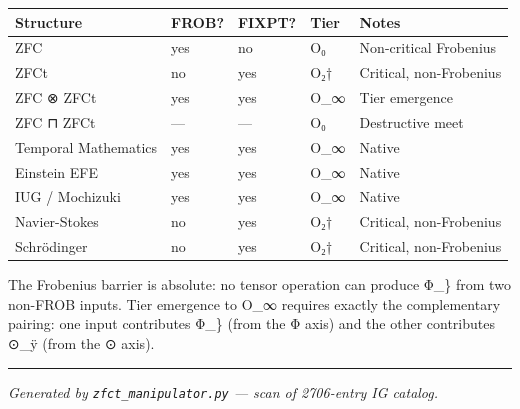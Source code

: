 {\def\LTcaptype{none} %
\begin{longtable}[]{@{}lllll@{}}
\toprule\noalign{}
Structure & FROB? & FIXPT? & Tier & Notes \\
\midrule\noalign{}
\endhead
\bottomrule\noalign{}
\endlastfoot
ZFC & yes & no & O₀ & Non-critical Frobenius \\
ZFCt & no & yes & O₂† & Critical, non-Frobenius \\
ZFC {\igprimfont\upshape ⊗} ZFCt & yes & yes & O\_∞ & Tier emergence \\
ZFC ⊓ ZFCt & --- & --- & O₀ & Destructive meet \\
Temporal Mathematics & yes & yes & O\_∞ & Native \\
Einstein EFE & yes & yes & O\_∞ & Native \\
IUG / Mochizuki & yes & yes & O\_∞ & Native \\
Navier-Stokes & no & yes & O₂† & Critical, non-Frobenius \\
Schrödinger & no & yes & O₂† & Critical, non-Frobenius \\
\end{longtable}
}

The Frobenius barrier is absolute: no tensor operation can produce Φ\_\}
from two non-FROB inputs. Tier emergence to O\_∞ requires exactly the
complementary pairing: one input contributes Φ\_\} (from the Φ axis) and
the other contributes ⊙\_ÿ (from the ⊙ axis).

\begin{center}\rule{0.5\linewidth}{0.5pt}\end{center}

\emph{Generated by \texttt{zfct\_manipulator.py} --- scan of 2706-entry
IG catalog.}
